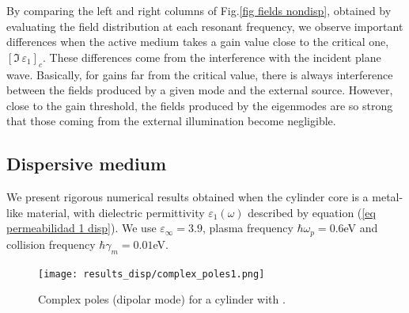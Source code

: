 \documentclass[9pt,twocolumn,twoside]{osajnl}
\begin{document}
By comparing the left and right columns of Fig.\ref{fig fields nondisp}, obtained by evaluating the field distribution at each resonant frequency, we observe important differences when the active medium takes a gain value close to the critical one, $[\Im\,\varepsilon_{1}]_c$.
These differences come from the interference with the incident plane wave. Basically, for gains far from the critical value, there is always interference between the fields produced by a given mode and the external source. However, close to the gain threshold, the fields produced by the eigenmodes are so strong that those coming from the external illumination become negligible.




\subsection{Dispersive medium}

We present rigorous numerical results obtained when the cylinder core is a 
metal-like material, with dielectric permittivity $\varepsilon_1(\omega)$ described by equation (\ref{eq permeabilidad 1 disp}). 
We use $\varepsilon_\infty=3.9$, plasma frequency $\hbar \omega_p=0.6$eV and collision frequency $\hbar \gamma_{m}=0.01$eV. 
%
\begin{figure}[h] %
\centering
\texttt{[image: results\_disp/complex\_poles1.png]}
\caption{Complex poles (dipolar mode) for a cylinder with \oneDisp.} \label{fig complex poles disp}
\end{figure}
%
\end{document}
